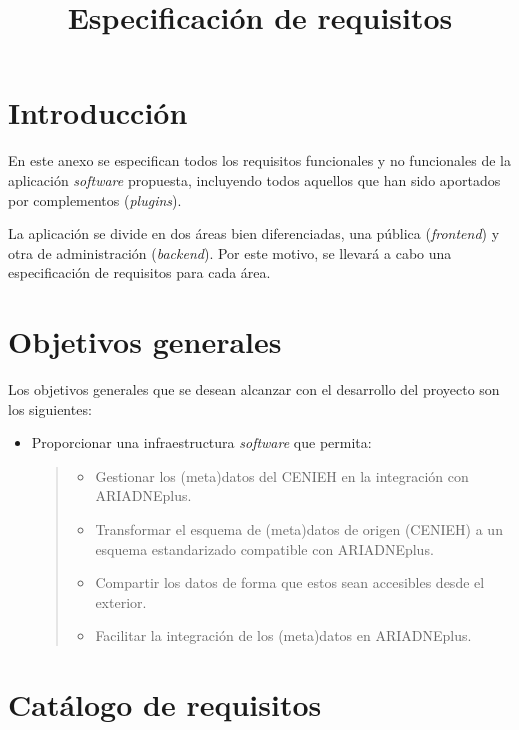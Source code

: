 \documentclass[
]{article}
\title{Especificación de requisitos}
\author{}
\date{}
\providecommand{\tightlist}{%
  \setlength{\itemsep}{0pt}\setlength{\parskip}{0pt}}
\begin{document}
\maketitle

\hypertarget{introducciuxf3n}{%
\section{Introducción}\label{introducciuxf3n}}

En este anexo se especifican todos los requisitos funcionales y no
funcionales de la aplicación \emph{software} propuesta, incluyendo todos
aquellos que han sido aportados por complementos (\emph{plugins}).

La aplicación se divide en dos áreas bien diferenciadas, una pública
(\emph{frontend}) y otra de administración (\emph{backend}). Por este
motivo, se llevará a cabo una especificación de requisitos para cada
área.

\hypertarget{objetivos-generales}{%
\section{Objetivos generales}\label{objetivos-generales}}

Los objetivos generales que se desean alcanzar con el desarrollo del
proyecto son los siguientes:

\begin{itemize}
\item
  Proporcionar una infraestructura \emph{software} que permita:

  \begin{quote}
  \begin{itemize}
  \tightlist
  \item
    Gestionar los (meta)datos del CENIEH en la integración con
    ARIADNEplus.
  \item
    Transformar el esquema de (meta)datos de origen (CENIEH) a un
    esquema estandarizado compatible con ARIADNEplus.
  \item
    Compartir los datos de forma que estos sean accesibles desde el
    exterior.
  \item
    Facilitar la integración de los (meta)datos en ARIADNEplus.
  \end{itemize}
  \end{quote}
\end{itemize}

\hypertarget{catuxe1logo-de-requisitos}{%
\section{Catálogo de requisitos}\label{catuxe1logo-de-requisitos}}
\end{document}
